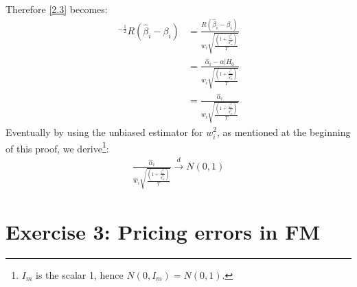\documentclass[12pt]{article}
\begin{document}
Therefore \ref{2.3} becomes:
\begin{align*}
[RV(\beta_i)R']^{-\frac{1}{2}}R(\hat{\beta}_i-\beta_i) &= \frac{R(\hat{\beta}_i-\beta_i)}{w_i\sqrt{\frac{(1 + \frac{\overline{z}_m^2}{\hat{\sigma}_{m}^2})}{T}}} \\
&= \frac{\hat{\alpha}_i - \alpha|H_0}{w_i\sqrt{\frac{(1 + \frac{\overline{z}_m^2}{\hat{\sigma}_{m}^2})}{T}}} \\
&= \frac{\hat{\alpha}_i}{w_i\sqrt{\frac{(1 + \frac{\overline{z}_m^2}{\hat{\sigma}_{m}^2})}{T}}}
\end{align*}
Eventually by using the unbiased estimator for $w_i^2$, as mentioned at the beginning of this proof, we derive\footnote{$I_m$ is the scalar 1, hence $N(0,I_m) = N(0,1)$.}: 
\begin{align}
\frac{\hat{\alpha}_i}{\hat{w}_i\sqrt{\frac{(1 + \frac{\overline{z}_m^2}{\hat{\sigma}_{m}^2})}{T}}} \overset{d}{\to} N(0,1)
\end{align}

\section{Exercise 3: Pricing errors in FM}
\end{document}
